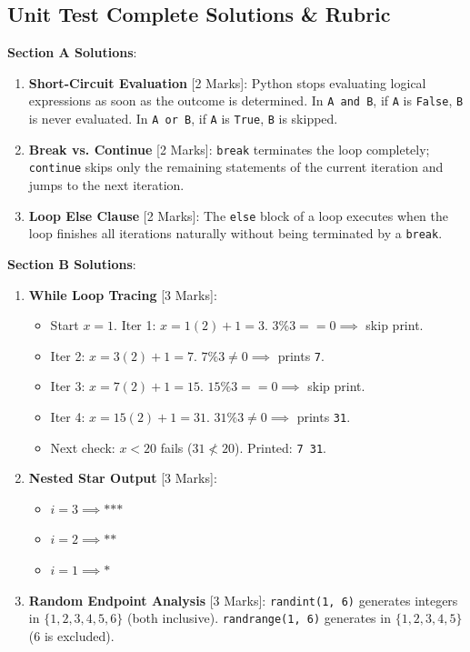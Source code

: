 \subsection{Unit Test Complete Solutions \& Rubric}

\begin{solutionbox}
\noindent\textbf{Section A Solutions}:
\begin{enumerate}
    \item \textbf{Short-Circuit Evaluation} [2 Marks]: Python stops evaluating logical expressions as soon as the outcome is determined. In \texttt{A and B}, if \texttt{A} is \texttt{False}, \texttt{B} is never evaluated. In \texttt{A or B}, if \texttt{A} is \texttt{True}, \texttt{B} is skipped.
    \item \textbf{Break vs. Continue} [2 Marks]: \texttt{break} terminates the loop completely; \texttt{continue} skips only the remaining statements of the current iteration and jumps to the next iteration.
    \item \textbf{Loop Else Clause} [2 Marks]: The \texttt{else} block of a loop executes when the loop finishes all iterations naturally without being terminated by a \texttt{break}.
\end{enumerate}

\noindent\textbf{Section B Solutions}:
\begin{enumerate}[start=4]
    \item \textbf{While Loop Tracing} [3 Marks]:
    \begin{itemize}
        \item Start $x=1$. Iter 1: $x = 1(2)+1 = 3$. $3\%3==0 \implies$ skip print.
        \item Iter 2: $x = 3(2)+1 = 7$. $7\%3 \ne 0 \implies$ prints \texttt{7}.
        \item Iter 3: $x = 7(2)+1 = 15$. $15\%3==0 \implies$ skip print.
        \item Iter 4: $x = 15(2)+1 = 31$. $31\%3 \ne 0 \implies$ prints \texttt{31}.
        \item Next check: $x < 20$ fails ($31 \not< 20$). Printed: \texttt{7 31}.
    \end{itemize}
    \item \textbf{Nested Star Output} [3 Marks]:
    \begin{itemize}
        \item $i=3 \implies \texttt{***}$
        \item $i=2 \implies \texttt{**}$
        \item $i=1 \implies \texttt{*}$
    \end{itemize}
    \item \textbf{Random Endpoint Analysis} [3 Marks]: \texttt{randint(1, 6)} generates integers in $\{1,2,3,4,5,6\}$ (both inclusive). \texttt{randrange(1, 6)} generates in $\{1,2,3,4,5\}$ ($6$ is excluded).
\end{enumerate}


\end{solutionbox}
